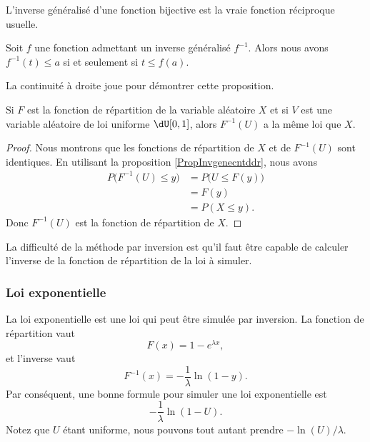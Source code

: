 \begin{remark}
    L'inverse généralisé d'une fonction bijective est la vraie fonction réciproque usuelle.
\end{remark}

\begin{proposition}     \label{PropInvgenecntddr}
    Soit \( f\) une fonction admettant un inverse généralisé \( f^{-1}\). Alors nous avons \( f^{-1}(t)\leq a\) si et seulement si \( t\leq f(a)\).
\end{proposition}
La continuité à droite joue pour démontrer cette proposition.


\begin{proposition}
    Si \( F\) est la fonction de répartition de la variable aléatoire \( X\) et si \( V\) est une variable aléatoire de loi uniforme \( \dU\mathopen[ 0 , 1 \mathclose]\), alors \( F^{-1}(U)\) a la même loi que \( X\).
\end{proposition}

\begin{proof}
    Nous montrons que les fonctions de répartition de \( X\) et de \( F^{-1}(U)\) sont identiques. En utilisant la proposition \ref{PropInvgenecntddr}, nous avons
    \begin{subequations}
        \begin{align}
            P\big( F^{-1}(U)\leq y \big)&=P\big( U\leq F(y) \big)\\
            &=F(y)\\
            &=P(X\leq y).
        \end{align}
    \end{subequations}
    Donc \( F^{-1}(U)\) est la fonction de répartition de \( X\).
\end{proof}

La difficulté de la méthode par inversion est qu'il faut être capable de calculer l'inverse de la fonction de répartition de la loi à simuler.

\subsubsection{Loi exponentielle}

La loi exponentielle est une loi qui peut être simulée par inversion. La fonction de répartition vaut
\begin{equation}
    F(x)=1- e^{\lambda x},
\end{equation}
et l'inverse vaut
\begin{equation}
    F^{-1}(x)=-\frac{1}{ \lambda }\ln(1-y).
\end{equation}
Par conséquent, une bonne formule pour simuler une loi exponentielle est
\begin{equation}
    -\frac{1}{ \lambda }\ln(1-U).
\end{equation}
Notez que \( U\) étant uniforme, nous pouvons tout autant prendre \( -\ln(U)/\lambda\).

